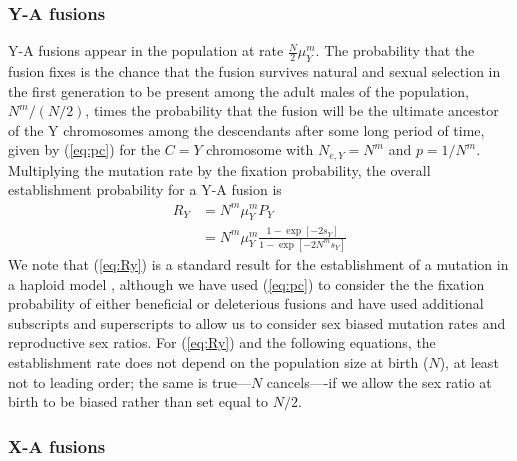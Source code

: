 \subsubsection{Y-A fusions}

Y-A fusions appear in the population at rate $\frac{N}{\text{2}}\mu^m_Y$. The probability that the fusion fixes is the chance that the fusion survives natural and sexual selection in the first generation to be present among the adult males of the population, $N^m / (N/\text{2})$, times the probability that the fusion will be the ultimate ancestor of the Y chromosomes among the descendants after some long period of time, given by (\ref{eq:pc}) for the $C = Y$ chromosome with $N_{e,Y}=N^m$ and $p=\text{1}/N^m$. Multiplying the mutation rate by the fixation probability, the overall establishment probability for a Y-A fusion is
\begin{align}\label{eq:Ry}
R_Y &= N^m \mu^m_Y  P_Y \nonumber \\
&= N^m \mu^m_Y \frac{\text{1}-\exp[-\text{2}s_Y]}{\text{1}-\exp[-\text{2}N^ms_Y]}
\end{align}
We note that (\ref{eq:Ry}) is a standard result for the establishment of a mutation in a haploid model \citep[e.g.,][]{Charlesworth1987, Kirkpatrick2004}, although we have used (\ref{eq:pc}) to consider the the fixation probability of either beneficial or deleterious fusions and have used additional subscripts and superscripts to allow us to consider sex biased mutation rates and reproductive sex ratios.  
For (\ref{eq:Ry}) and the following equations, the establishment rate does not depend on the population size at birth ($N$), at least not to leading order;  the same is true---$N$ cancels----if we allow the sex ratio at birth to be biased rather than set equal to $N/\text{2}$.

\subsubsection{X-A fusions}

